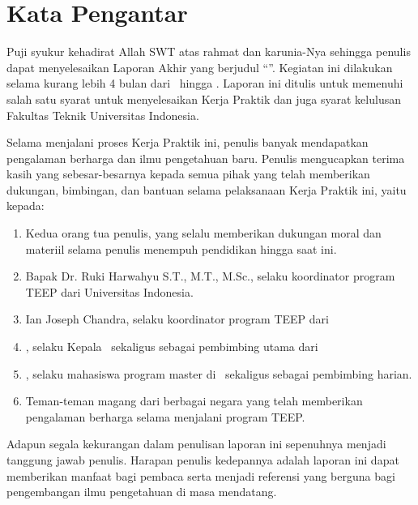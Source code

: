 \chapter*{Kata Pengantar}

Puji syukur kehadirat Allah SWT atas rahmat dan karunia-Nya sehingga penulis dapat menyelesaikan Laporan Akhir yang berjudul “\judul”. Kegiatan ini dilakukan selama
kurang lebih 4 bulan dari \startMagang \ hingga \akhirMagang. Laporan ini ditulis
untuk memenuhi salah satu syarat untuk menyelesaikan Kerja Praktik dan juga
syarat kelulusan Fakultas Teknik Universitas Indonesia.

Selama menjalani proses Kerja Praktik ini, penulis banyak mendapatkan pengalaman berharga dan ilmu pengetahuan baru. Penulis mengucapkan terima kasih yang sebesar-besarnya kepada semua pihak yang telah memberikan dukungan, bimbingan, dan bantuan selama pelaksanaan Kerja Praktik ini, yaitu kepada:

\begin{enumerate}
	\item Kedua orang tua penulis, yang selalu memberikan dukungan moral dan materiil selama penulis menempuh pendidikan hingga saat ini.
        \item Bapak Dr. Ruki Harwahyu S.T., M.T., M.Sc., selaku koordinator program TEEP dari Universitas Indonesia.
	\item Ian Joseph Chandra, selaku koordinator program TEEP dari \namaUniv
	\item \pembimbingUtama, selaku 
        Kepala \namaLab \ sekaligus sebagai pembimbing utama dari \namaUniv
	\item \pembimbingHarian, selaku mahasiswa program master di \namaLab \ sekaligus sebagai pembimbing harian.
        \item Teman-teman magang dari berbagai negara yang telah memberikan pengalaman berharga selama menjalani program TEEP.
\end{enumerate}

Adapun segala kekurangan dalam penulisan laporan ini sepenuhnya menjadi tanggung jawab penulis. Harapan penulis kedepannya adalah laporan ini dapat memberikan manfaat bagi pembaca serta menjadi referensi yang berguna bagi pengembangan ilmu pengetahuan di masa mendatang.

